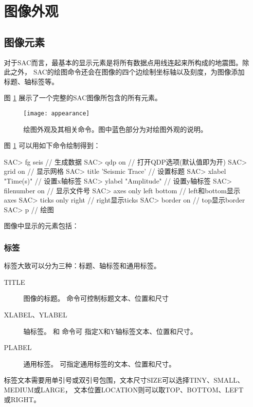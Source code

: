 \section{图像外观}
\label{sec:plot-appearance}

\subsection{图像元素}
对于SAC而言，最基本的显示元素是将所有数据点用线连起来所构成的地震图。除此之外，
SAC的绘图命令还会在图像的四个边绘制坐标轴以及刻度，为图像添加标题、轴标签等。

图 \ref{fig:plot-appearance} 展示了一个完整的SAC图像所包含的所有元素。

\begin{figure}[H]
\centering
\texttt{[image: appearance]}
\caption[绘图外观相关命令]{绘图外观及其相关命令。图中蓝色部分为对绘图外观的说明。}
\label{fig:plot-appearance}
\end{figure}

图 \ref{fig:plot-appearance} 可以用如下命令绘制得到：
\begin{SACCode}
SAC> fg seis                // 生成数据
SAC> qdp on                 // 打开QDP选项(默认值即为开)
SAC> grid on                // 显示网格
SAC> title 'Seismic Trace'  // 设置标题
SAC> xlabel "Time(s)"       // 设置x轴标签
SAC> ylabel "Amplitude"     // 设置y轴标签
SAC> filenumber on          // 显示文件号
SAC> axes only left bottom  // left和bottom显示axes
SAC> ticks only right       // right显示ticks
SAC> border on              // top显示border
SAC> p                      // 绘图
\end{SACCode}

图像中显示的元素包括：
\subsubsection{标签}
标签大致可以分为三种：标题、轴标签和通用标签。
\begin{description}
\item[TITLE] 图像的标题。 命令可控制标题文本、位置和尺寸
\item[XLABEL、YLABEL] 轴标签。 和  命令可
    指定X和Y轴标签文本、位置和尺寸。
\item[PLABEL] 通用标签。 可指定通用标签的文本、位置和尺寸。
\end{description}

标签文本需要用单引号或双引号包围，文本尺寸SIZE可以选择TINY、SMALL、MEDIUM或LARGE，
文本位置LOCATION则可以取TOP、BOTTOM、LEFT或RIGHT。

